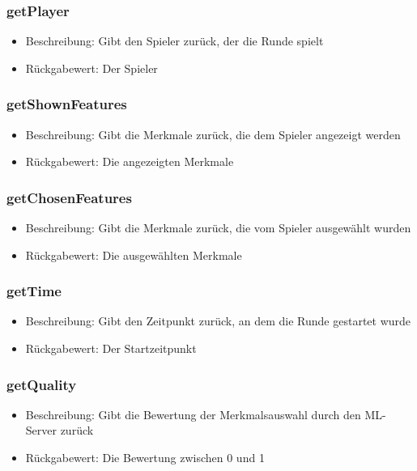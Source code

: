 \documentclass[a4paper]{scrreprt}
\begin{document}
   \subsubsection{getPlayer}
      \begin{itemize}
          \item Beschreibung: Gibt den Spieler zurück, der die Runde spielt
          \item Rückgabewert: Der Spieler
      \end{itemize}
   \subsubsection{getShownFeatures}
      \begin{itemize}
          \item Beschreibung: Gibt die Merkmale zurück, die dem Spieler angezeigt werden
          \item Rückgabewert: Die angezeigten Merkmale
      \end{itemize}
   \subsubsection{getChosenFeatures}
      \begin{itemize}
          \item Beschreibung: Gibt die Merkmale zurück, die vom Spieler ausgewählt wurden
          \item Rückgabewert: Die ausgewählten Merkmale
      \end{itemize}
   \subsubsection{getTime}
      \begin{itemize}
          \item Beschreibung: Gibt den Zeitpunkt zurück, an dem die Runde gestartet wurde
          \item Rückgabewert: Der Startzeitpunkt 
      \end{itemize}
   \subsubsection{getQuality}
      \begin{itemize}
          \item Beschreibung: Gibt die Bewertung der Merkmalsauswahl durch den ML-Server zurück
          \item Rückgabewert: Die Bewertung zwischen 0 und 1
      \end{itemize}
\end{document}
